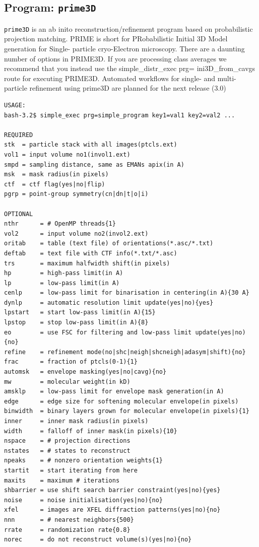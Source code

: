\documentclass[a4paper,11pt]{article}
\newcommand{\prgname}[1]{\textcolor{NavyBlue}{\texttt{#1}}}
\begin{document}
\subsection{Program: \prgname{prime3D}}
\label{prime3D}
\prgname{prime3D} is an ab inito reconstruction/refinement program based on probabilistic projection matching. PRIME is short for PRobabilistic Initial 3D Model generation for Single- particle cryo-Electron microscopy. There are a daunting number of options in PRIME3D. If you are processing class averages we recommend that you instead use the simple\_distr\_exec prg= ini3D\_from\_cavgs route for executing PRIME3D. Automated workflows for single- and multi-particle refinement using prime3D are planned for the next release (3.0)

\begin{verbatim}
USAGE:
bash-3.2$ simple_exec prg=simple_program key1=val1 key2=val2 ...

REQUIRED
stk  = particle stack with all images(ptcls.ext)
vol1 = input volume no1(invol1.ext)
smpd = sampling distance, same as EMANs apix(in A)
msk  = mask radius(in pixels)
ctf  = ctf flag(yes|no|flip)
pgrp = point-group symmetry(cn|dn|t|o|i)

OPTIONAL
nthr      = # OpenMP threads{1}
vol2      = input volume no2(invol2.ext)
oritab    = table (text file) of orientations(*.asc/*.txt)
deftab    = text file with CTF info(*.txt/*.asc)
trs       = maximum halfwidth shift(in pixels)
hp        = high-pass limit(in A)
lp        = low-pass limit(in A)
cenlp     = low-pass limit for binarisation in centering(in A){30 A}
dynlp     = automatic resolution limit update(yes|no){yes}
lpstart   = start low-pass limit(in A){15}
lpstop    = stop low-pass limit(in A){8}
eo        = use FSC for filtering and low-pass limit update(yes|no){no}
refine    = refinement mode(no|shc|neigh|shcneigh|adasym|shift){no}
frac      = fraction of ptcls(0-1){1}
automsk   = envelope masking(yes|no|cavg){no}
mw        = molecular weight(in kD)
amsklp    = low-pass limit for envelope mask generation(in A)
edge      = edge size for softening molecular envelope(in pixels)
binwidth  = binary layers grown for molecular envelope(in pixels){1}
inner     = inner mask radius(in pixels)
width     = falloff of inner mask(in pixels){10}
nspace    = # projection directions
nstates   = # states to reconstruct
npeaks    = # nonzero orientation weights{1}
startit   = start iterating from here
maxits    = maximum # iterations
shbarrier = use shift search barrier constraint(yes|no){yes}
noise     = noise initialisation(yes|no){no}
xfel      = images are XFEL diffraction patterns(yes|no){no}
nnn       = # nearest neighbors{500}
rrate     = randomization rate{0.8}
norec     = do not reconstruct volume(s)(yes|no){no}
\end{verbatim}
\end{document}
